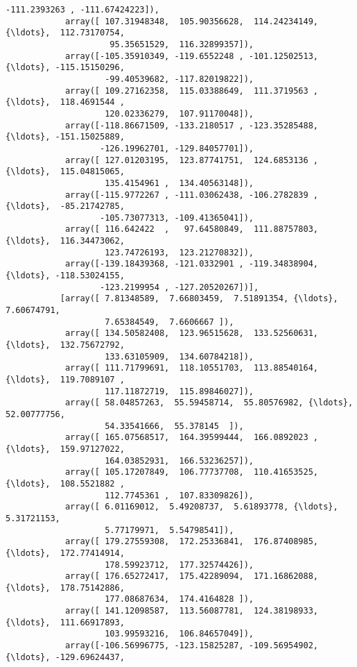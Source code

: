 \documentclass[11pt]{article}
\begin{document}
\begin{Verbatim}[commandchars=\\\{\}]
                   -111.2393263 , -111.67424223]),
            array([ 107.31948348,  105.90356628,  114.24234149, {\ldots},  112.73170754,
                     95.35651529,  116.32899357]),
            array([-105.35910349, -119.6552248 , -101.12502513, {\ldots}, -115.15150296,
                    -99.40539682, -117.82019822]),
            array([ 109.27162358,  115.03388649,  111.3719563 , {\ldots},  118.4691544 ,
                    120.02336279,  107.91170048]),
            array([-118.86671509, -133.2180517 , -123.35285488, {\ldots}, -151.15025889,
                   -126.19962701, -129.84057701]),
            array([ 127.01203195,  123.87741751,  124.6853136 , {\ldots},  115.04815065,
                    135.4154961 ,  134.40563148]),
            array([-115.9772267 , -111.03062438, -106.2782839 , {\ldots},  -85.21742785,
                   -105.73077313, -109.41365041]),
            array([ 116.642422  ,   97.64580849,  111.88757803, {\ldots},  116.34473062,
                    123.74726193,  123.21270832]),
            array([-139.18439368, -121.0332901 , -119.34838904, {\ldots}, -118.53024155,
                   -123.2199954 , -127.20520267])],
           [array([ 7.81348589,  7.66803459,  7.51891354, {\ldots},  7.60674791,
                    7.65384549,  7.6606667 ]),
            array([ 134.50582408,  123.96515628,  133.52560631, {\ldots},  132.75672792,
                    133.63105909,  134.60784218]),
            array([ 111.71799691,  118.10551703,  113.88540164, {\ldots},  119.7089107 ,
                    117.11872719,  115.89846027]),
            array([ 58.04857263,  55.59458714,  55.80576982, {\ldots},  52.00777756,
                    54.33541666,  55.378145  ]),
            array([ 165.07568517,  164.39599444,  166.0892023 , {\ldots},  159.97127022,
                    164.03852931,  166.53236257]),
            array([ 105.17207849,  106.77737708,  110.41653525, {\ldots},  108.5521882 ,
                    112.7745361 ,  107.83309826]),
            array([ 6.01169012,  5.49208737,  5.61893778, {\ldots},  5.31721153,
                    5.77179971,  5.54798541]),
            array([ 179.27559308,  172.25336841,  176.87408985, {\ldots},  172.77414914,
                    178.59923712,  177.32574426]),
            array([ 176.65272417,  175.42289094,  171.16862088, {\ldots},  178.75142886,
                    177.08687634,  174.4164828 ]),
            array([ 141.12098587,  113.56087781,  124.38198933, {\ldots},  111.66917893,
                    103.99593216,  106.84657049]),
            array([-106.56996775, -123.15825287, -109.56954902, {\ldots}, -129.69624437,

\end{Verbatim}
\end{document}
